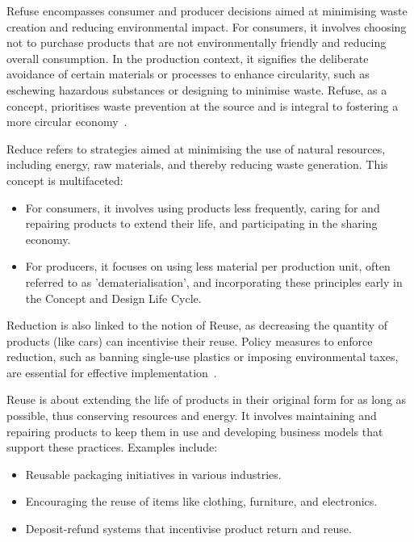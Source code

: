 Refuse encompasses consumer and producer decisions aimed at minimising waste creation and reducing environmental impact. For consumers, it involves choosing not to purchase products that are not environmentally friendly and reducing overall consumption. In the production context, it signifies the deliberate avoidance of certain materials or processes to enhance circularity, such as eschewing hazardous substances or designing to minimise waste. Refuse, as a concept, prioritises waste prevention at the source and is integral to fostering a more circular economy~\cite{reike2018rex}.

Reduce refers to strategies aimed at minimising the use of natural resources, including energy, raw materials, and thereby reducing waste generation. This concept is multifaceted:

\begin{itemize}
    \item For consumers, it involves using products less frequently, caring for and repairing products to extend their life, and participating in the sharing economy.
    \item For producers, it focuses on using less material per production unit, often referred to as 'dematerialisation', and incorporating these principles early in the Concept and Design Life Cycle.
\end{itemize}

Reduction is also linked to the notion of Reuse, as decreasing the quantity of products (like cars) can incentivise their reuse. Policy measures to enforce reduction, such as banning single-use plastics or imposing environmental taxes, are essential for effective implementation~\cite{maitreekern2019rex}.

Reuse is about extending the life of products in their original form for as long as possible, thus conserving resources and energy. It involves maintaining and repairing products to keep them in use and developing business models that support these practices. Examples include:

\begin{itemize}
    \item Reusable packaging initiatives in various industries.
    \item Encouraging the reuse of items like clothing, furniture, and electronics.
    \item Deposit-refund systems that incentivise product return and reuse.
\end{itemize}

